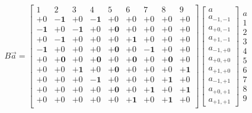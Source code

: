\documentclass{article}
\newcommand{\0}{\mathbf{0}}
\newcommand{\1}{\mathbf{1}}
\newcommand{\2}{\mathbf{2}}
\newcommand{\3}{\mathbf{3}}
\newcommand{\4}{\mathbf{4}}
\newcommand{\5}{\mathbf{5}}
\newcommand{\6}{\mathbf{6}}
\newcommand{\7}{\mathbf{7}}
\newcommand{\8}{\mathbf{8}}
\begin{document}
\begin{small}
\setlength\arraycolsep{1.2pt}  
\begin{align*}  
  B\vec{a}=  
  \left[
   \begin{array}{rrrrrrrrr}  
     1& 2& 3& 4& 5& 6& 7& 8& 9\\    %
    +0&-\1&+0&-\1&+0&+0&+0&+0&+0\\    %
    -\1&+0&-\1&+0&+\0&+0&+0&+0&+0\\    %
    +0&-\1&+0&+0&+0&+\1&+0&+0&+0\\    %
    -\1&+0&+0&+0&+\0&+0&-\1&+0&+0\\    %
    +0&+\0&+0&+\0&+0&+\0&+0&+\0&+0\\    %
    +0&+0&+\1&+0&+\0&+0&+0&+0&+\1\\    %
    +0&+0&+0&-\1&+0&+0&+0&+\1&+0\\    %
    +0&+0&+0&+0&+\0&+0&+\1&+0&+\1\\    %
    +0&+0&+0&+0&+0&+\1&+0&+\1&+0\\    %
   \end{array}
  \right]
  \left[
  \begin{array}{c}  
    a\\a_{-1,-1}\\a_{+0,-1}\\a_{+1,-1}\\
       a_{-1,+0}\\a_{+0,+0}\\a_{+1,+0}\\
       a_{-1,+1}\\a_{+0,+1}\\a_{+1,+1}
  \end{array}
  \right]
  \begin{array}{c}  
    a\\1\\2\\3\\4\\5\\
    6\\7\\8\\9
  \end{array}
\end{align*}
\end{small}
%
\end{document}
